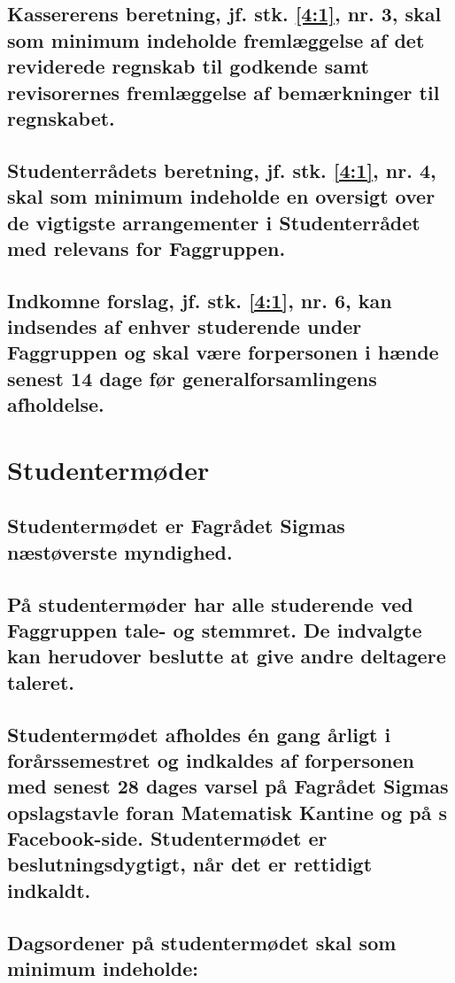 \documentclass[10pt]{article}
\newcommand{\fagr}{\text{Fagrådet Sigma}}
\begin{document}
\subsection{Kassererens beretning, jf. stk. \ref{4:1}, nr. 3, skal som minimum indeholde fremlæggelse af det reviderede regnskab til godkende samt revisorernes fremlæggelse af bemærkninger til regnskabet.}

\subsection{Studenterrådets beretning, jf. stk. \ref{4:1}, nr. 4, skal som minimum indeholde en oversigt over de vigtigste arrangementer i Studenterrådet med relevans for Faggruppen.}

\subsection{Indkomne forslag, jf. stk. \ref{4:1}, nr. 6, kan indsendes af enhver studerende under Faggruppen og skal være forpersonen i hænde senest 14 dage før generalforsamlingens afholdelse.}

\section{Studentermøder}

\subsection{Studentermødet er Fagrådet Sigmas næstøverste myndighed.}

\subsection{På studentermøder har alle studerende ved Faggruppen tale- og stemmret. De indvalgte kan herudover beslutte at give andre deltagere taleret.}

\subsection{Studentermødet afholdes én gang årligt i forårssemestret og indkaldes af forpersonen med senest 28 dages varsel på Fagrådet Sigmas opslagstavle foran Matematisk Kantine og på \fagr{}s Facebook-side. Studentermødet er beslutningsdygtigt, når det er rettidigt indkaldt.}

\subsection{Dagsordener på studentermødet skal som minimum indeholde:}
\end{document}
